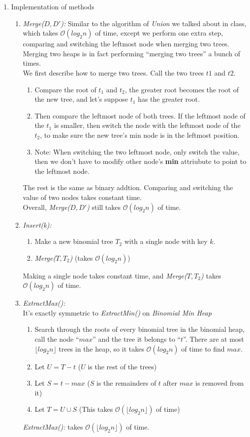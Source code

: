 \documentclass[10pt]{article}
\begin{document}
\begin{enumerate}
\item Implementation of methods
\begin{enumerate}
\item \textit{Merge($D, D'$):}
Similar to the algorithm of \textit{Union} we talked about in class, which takes $\mathcal{O}(log_2n)$ of time, except we perform one extra step, comparing and switching the leftmost node when merging two trees.\\
Merging two heaps is in fact performing ``merging two trees'' a bunch of times. \\
We first describe how to merge two trees. Call the two trees $t1$ and $t2$.
\begin{enumerate}
\item Compare the root of $t_1$ and $t_2$, the greater root becomes the root of the new tree, and let's suppose $t_1$ has the greater root.
\item Then compare the leftmost node of both trees. If the leftmost node of the $t_1$ is smaller, then switch the node with the leftmost node of the $t_2$, to make sure the new tree's min node is in the leftmost position.
\item Note: When switching the two leftmost node, only switch the value, then we don't have to modify other node's \textbf{min} attriubute to point to the leftmost node.
\end{enumerate}
The rest is the same as binary addtion. Comparing and switching the value of two nodes takes constant time. \\
Overall, \textit{Merge($D, D'$)} still takes $\mathcal{O}(log_2n)$ of time.
\item \textit{Insert(k):} 
\begin{enumerate}
\item Make a new binomial tree $T_2$ with a single node with key $k$.
\item \textit{Merge($T,T_2$)} \null\hfill (takes $\mathcal{O}(log_2n)$)
\end{enumerate}
Making a single node takes constant time, and \textit{Merge($T,T_2$)} takes $\mathcal{O}(log_2n)$ of time.
\item \textit{ExtractMax():}\\
It's exactly symmetric to \textit{ExtractMin()} on \textit{Binomial Min Heap} 
\begin{enumerate}
\item Search through the roots of every binomial tree in the binomial heap, call the node ``$max$'' and the tree it belongs to ``$t$''. There are at most $\lfloor log_2n \rfloor$ trees in the heap, so it takes $\mathcal{O}(log_2n)$ of time to find $max$.
\item Let $U=T-t$ \null\hfill ($U$ is the rest of the trees)
\item Let $S=t-max$ \null\hfill ($S$ is the remainders of $t$ after $max$ is removed from it)
\item Let $T=U \cup S$ \null\hfill (This takes $\mathcal{O}(\lfloor log_2n\rfloor)$ of time)
\end{enumerate}
\textit{ExtractMax():} takes $\mathcal{O}(\lfloor log_2n\rfloor)$ of time.


\end{enumerate}
\end{enumerate}
\end{document}
